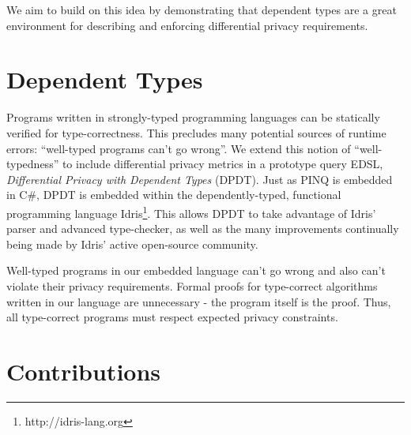 \documentclass[12pt]{report}
\begin{document}
We aim to build on this idea by demonstrating that dependent types are a great environment for describing and enforcing differential privacy requirements.

\section{Dependent Types}\label{sec:intro-deptyps}


Programs written in strongly-typed programming languages can be statically verified for type-correctness.
This precludes many potential sources of runtime errors: ``well-typed programs can't go wrong''.
We extend this notion of ``well-typedness'' to include differential privacy metrics in a prototype query EDSL, \textit{Differential Privacy with Dependent Types} (DPDT).
Just as PINQ is embedded in C\#, DPDT is embedded within the dependently-typed, functional programming language Idris\footnote{http://idris-lang.org}.
This allows DPDT to take advantage of Idris' parser and advanced type-checker, as well as the many improvements continually being made by Idris' active open-source community.

Well-typed programs in our embedded language can't go wrong and also can't violate their privacy requirements.
Formal proofs for type-correct algorithms written in our language are unnecessary - the program itself is the proof.
Thus, all type-correct programs must respect expected privacy constraints.

\section{Contributions}
\end{document}
